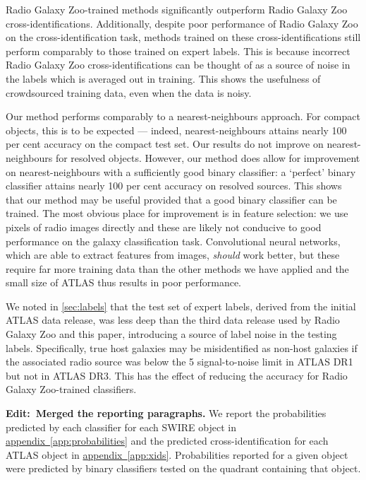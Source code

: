 \documentclass[fleqn,usenatbib,usedcolumn]{mnras}
\newcommand{\edit}[1]{{\bf Edit:~{#1}}}
\newcommand{\aref}[1]{\hyperref[#1]{appendix~\ref{#1}}}
\begin{document}
    Radio Galaxy Zoo-trained methods significantly outperform Radio Galaxy Zoo cross-identifications. Additionally, despite poor performance of Radio Galaxy Zoo on the cross-identification task, methods trained on these cross-identifications still perform comparably to those trained on expert labels. This is because incorrect Radio Galaxy Zoo cross-identifications can be thought of as a source of noise in the labels which is averaged out in training. This shows the usefulness of crowdsourced training data, even when the data is noisy.

    Our method performs comparably to a nearest-neighbours approach. For compact objects, this is to be expected --- indeed, nearest-neighbours attains nearly 100 per cent accuracy on the compact test set. Our results do not improve on nearest-neighbours for resolved objects. However, our method does allow for improvement on nearest-neighbours with a sufficiently good binary classifier: a `perfect' binary classifier attains nearly 100 per cent accuracy on resolved sources. This shows that our method may be useful provided that a good binary classifier can be trained. The most obvious place for improvement is in feature selection: we use pixels of radio images directly and these are likely not conducive to good performance on the galaxy classification task. Convolutional neural networks, which are able to extract features from images, \emph{should} work better, but these require far more training data than the other methods we have applied and the small size of ATLAS thus results in poor performance.

    We noted in \autoref{sec:labels} that the test set of expert labels, derived from the initial ATLAS data release, was less deep than the third data release used by Radio Galaxy Zoo and this paper, introducing a source of label noise in the testing labels. Specifically, true host galaxies may be misidentified as non-host galaxies if the associated radio source was below the 5 signal-to-noise limit in ATLAS DR1 but not in ATLAS DR3. This has the effect of reducing the accuracy for Radio Galaxy Zoo-trained classifiers.

    \edit{Merged the reporting paragraphs.} We report the probabilities predicted by each classifier for each SWIRE object in \aref{app:probabilities} and the predicted cross-identification for each ATLAS object in \aref{app:xids}. Probabilities reported for a given object were predicted by binary classifiers tested on the quadrant containing that object.
\end{document}
